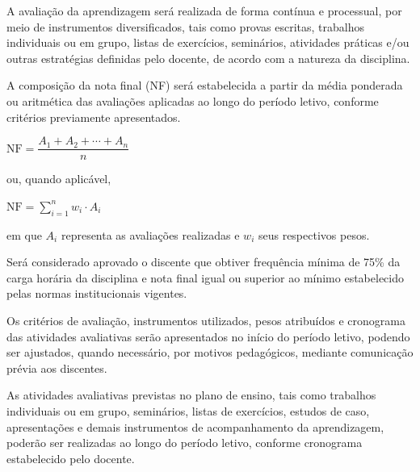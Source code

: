 \documentclass[oneside,a4paper,12pt]{article}
\begin{document}
A avaliação da aprendizagem será realizada de forma contínua e processual, por meio de instrumentos diversificados, tais como provas escritas, trabalhos individuais ou em grupo, listas de exercícios, seminários, atividades práticas e/ou outras estratégias definidas pelo docente, de acordo com a natureza da disciplina.

A composição da nota final (NF) será estabelecida a partir da média ponderada ou aritmética das avaliações aplicadas ao longo do período letivo, conforme critérios previamente apresentados.

\begin{center}
$\mathrm{NF} = \dfrac{A_1 + A_2 + \cdots + A_n}{n}$
\end{center}

ou, quando aplicável,

\begin{center}
$\mathrm{NF} = \sum_{i=1}^{n} w_i \cdot A_i$
\end{center}

em que $A_i$ representa as avaliações realizadas e $w_i$ seus respectivos pesos.

Será considerado aprovado o discente que obtiver frequência mínima de 75\% da carga horária da disciplina e nota final igual ou superior ao mínimo estabelecido pelas normas institucionais vigentes.

Os critérios de avaliação, instrumentos utilizados, pesos atribuídos e cronograma das atividades avaliativas serão apresentados no início do período letivo, podendo ser ajustados, quando necessário, por motivos pedagógicos, mediante comunicação prévia aos discentes.

As atividades avaliativas previstas no plano de ensino, tais como trabalhos individuais ou em grupo, seminários, listas de exercícios, estudos de caso, apresentações e demais instrumentos de acompanhamento da aprendizagem, poderão ser realizadas ao longo do período letivo, conforme cronograma estabelecido pelo docente.
\end{document}
